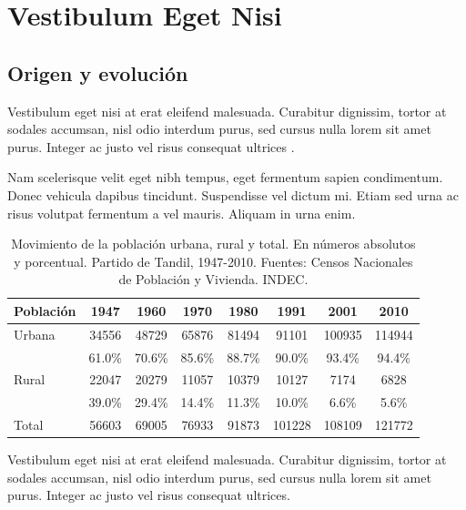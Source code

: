 \chapter{Vestibulum Eget Nisi}
\setcounter{PrimPag}{\theCurrentPage}

\section{Origen y evolución}

Vestibulum eget nisi at erat eleifend malesuada. Curabitur dignissim, tortor at sodales accumsan, nisl odio interdum purus, sed cursus nulla lorem sit amet purus. Integer ac justo vel risus consequat ultrices \parencite{@6445-LECUN2015}.

Nam scelerisque velit eget nibh tempus, eget fermentum sapien condimentum. Donec vehicula dapibus tincidunt. Suspendisse vel dictum mi. Etiam sed urna ac risus volutpat fermentum a vel mauris. Aliquam in urna enim.

\begin{table}[!ht]
	\sf\footnotesize\setlength\tabcolsep{4pt}
	\centering
	\begin{tabular}{l | S[table-format=5.0] | S[table-format=5.0] | S[table-format=5.0] | S[table-format=5.0] | S[table-format=6.0] | S[table-format=6.0] | S[table-format=6.0]}
		\toprule
		\textbf{Población} & \textbf{1947} & \textbf{1960} & \textbf{1970} & \textbf{1980} & \textbf{1991} & \textbf{2001} & \textbf{2010} \\
		\midrule
		Urbana & 34556 & 48729 & 65876 & 81494 & 91101 & 100935 & 114944 \\
		& {61.0\%} & {70.6\%} & {85.6\%} & {88.7\%} & {90.0\%} & {93.4\%} & {94.4\%} \\
		\midrule
		Rural & 22047 & 20279 & 11057 & 10379 & 10127 & 7174 & 6828 \\
		& {39.0\%} & {29.4\%} & {14.4\%} & {11.3\%} & {10.0\%} & {6.6\%} & {5.6\%} \\
		\midrule
		Total & 56603 & 69005 & 76933 & 91873 & 101228 & 108109 & 121772 \\
		\bottomrule
	\end{tabular}
	\caption{Movimiento de la población urbana, rural y total. En números absolutos y porcentual. Partido de Tandil, 1947-2010. Fuentes: Censos Nacionales de Población y Vivienda. INDEC.}\label{cap3-1}
\end{table}

Vestibulum eget nisi at erat eleifend malesuada. Curabitur dignissim, tortor at sodales accumsan, nisl odio interdum purus, sed cursus nulla lorem sit amet purus. Integer ac justo vel risus consequat ultrices.

